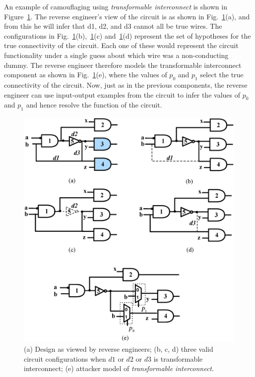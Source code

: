 \documentclass[thesis]{umassthesis}  %
\begin{document}
An example of camouflaging using \textit{transformable interconnect} is shown in Figure~\ref{fig:dummywire}. The reverse engineer's view of the circuit is as shown in Fig.~\ref{fig:dummywire}(a), and from this he will infer that d1, d2, and d3 cannot all be true wires. The configurations in Fig.~\ref{fig:dummywire}(b),~\ref{fig:dummywire}(c) and~\ref{fig:dummywire}(d) represent the set of hypotheses for the true connectivity of the circuit. Each one of these would represent the circuit functionality under a single guess about which wire was a non-conducting dummy. The reverse engineer therefore models the transformable interconnect component as shown in Fig.~\ref{fig:dummywire}(e), where the values of $p_0$ and $p_1$ select the true connectivity of the circuit. Now, just as in the previous components, the reverse engineer can use input-output examples from the circuit to infer the values of $p_0$ and $p_1$ and hence resolve the function of the circuit. 


\begin{figure}[t] 
\begin{center}
\includegraphics[scale=0.5]{figures/dummywire.eps}
\caption{(a) Design as viewed by reverse engineers; (b, c, d) three valid circuit configurations when $d1$ or $d2$ or $d3$ is transformable interconnect; (e) attacker model of \textit{transformable interconnect}.}
\label{fig:dummywire}
\end{center}
\end{figure}
\end{document}
